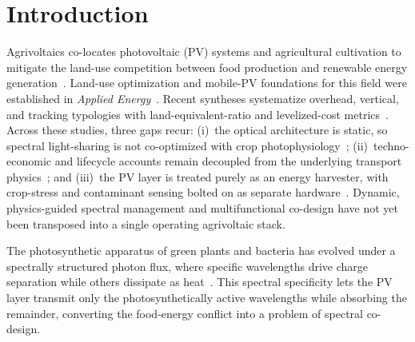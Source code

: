\documentclass[preprint,12pt]{elsarticle}
\begin{document}

\section{Introduction}

Agrivoltaics co-locates photovoltaic (PV) systems and agricultural cultivation to mitigate the land-use competition between food production and renewable energy generation~\cite{Dupraz2011}. Land-use optimization and mobile-PV foundations for this field were established in \textit{Applied Energy}~\cite{Valle2017,Amaducci2018}. Recent syntheses systematize overhead, vertical, and tracking typologies with land-equivalent-ratio and levelized-cost metrics~\cite{Mahim2025}.
Across these studies, three gaps recur: (i)~the optical architecture is static, so spectral light-sharing is not co-optimized with crop photophysiology~\cite{Thompson2020,Zhao2023}; (ii)~techno-economic and lifecycle accounts remain decoupled from the underlying transport physics~\cite{Ravilla2024,Bellone2024}; and (iii)~the PV layer is treated purely as an energy harvester, with crop-stress and contaminant sensing bolted on as separate hardware~\cite{CiallaMay2024,Pook2025,KaurJeet2026}. Dynamic, physics-guided spectral management and multifunctional co-design have not yet been transposed into a single operating agrivoltaic stack.

The photosynthetic apparatus of green plants and bacteria has evolved under a spectrally structured photon flux, where specific wavelengths drive charge separation while others dissipate as heat~\cite{Blankenship2011}.
This spectral specificity lets the PV layer transmit only the photosynthetically active wavelengths while absorbing the remainder, converting the food-energy conflict into a problem of spectral co-design.
\end{document}
